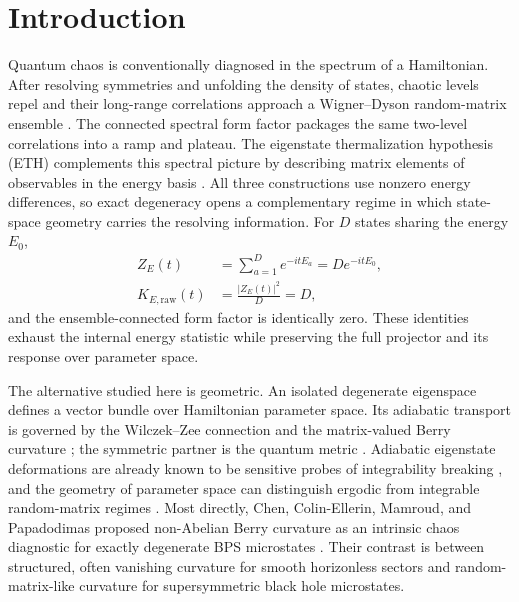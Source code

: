 \section{Introduction}
\label{sec:introduction}

Quantum chaos is conventionally diagnosed in the spectrum of a Hamiltonian.
After resolving symmetries and unfolding the density of states, chaotic levels
repel and their long-range correlations approach a Wigner--Dyson random-matrix
ensemble \cite{bohigas1984,atas2013}.
The connected spectral form factor packages the same two-level correlations
into a ramp and plateau.
The eigenstate thermalization hypothesis (ETH) complements this spectral
picture by describing matrix elements of observables in the energy basis
\cite{deutsch1991,srednicki1994,dalessio2016}.
All three constructions use nonzero energy differences, so exact degeneracy
opens a complementary regime in which state-space geometry carries the
resolving information.  For \(D\) states sharing the energy \(E_0\),
\begin{equation}
 \begin{aligned}
 Z_E(t)&=\sum_{a=1}^{D}e^{-itE_a}=D e^{-itE_0},\\
 K_{E,\mathrm{raw}}(t)&=\frac{|Z_E(t)|^2}{D}=D ,
 \end{aligned}
 \label{eq:energy-silence}
\end{equation}
and the ensemble-connected form factor is identically zero.  These identities
exhaust the internal energy statistic while preserving the full projector and
its response over parameter space.

The alternative studied here is geometric.
An isolated degenerate eigenspace defines a vector bundle over Hamiltonian
parameter space.
Its adiabatic transport is governed by the Wilczek--Zee connection and the
matrix-valued Berry curvature \cite{kato1950,berry1984,wilczekzee1984};
the symmetric partner is the quantum metric
\cite{provostvallee1980,kolodrubetz2017}.
Adiabatic eigenstate deformations are already known to be sensitive probes of
integrability breaking \cite{pandey2020}, and the geometry of parameter space
can distinguish ergodic from integrable random-matrix regimes
\cite{sharipov2024}.
Most directly, Chen, Colin-Ellerin, Mamroud, and Papadodimas proposed
non-Abelian Berry curvature as an intrinsic chaos diagnostic for exactly
degenerate BPS microstates \cite{chen2026}.
Their contrast is between structured, often vanishing curvature for smooth
horizonless sectors and random-matrix-like curvature for supersymmetric black
hole microstates.

